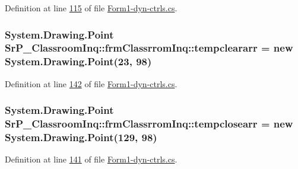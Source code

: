 \-Definition at line \hyperlink{_form1-dyn-ctrls_8cs_source_l00115}{115} of file \hyperlink{_form1-dyn-ctrls_8cs_source}{\-Form1-\/dyn-\/ctrls.\-cs}.

\hypertarget{class_sr_p___classroom_inq_1_1frm_classrrom_inq_a189c01a3745fca62a8250be6a3517894}{
\subsubsection[{tempcleararr}]{\setlength{\rightskip}{0pt plus 5cm}\-System.\-Drawing.\-Point {\bf \-Sr\-P\-\_\-\-Classroom\-Inq\-::frm\-Classrrom\-Inq\-::tempcleararr} = new \-System.\-Drawing.\-Point(23, 98)}}
\label{class_sr_p___classroom_inq_1_1frm_classrrom_inq_a189c01a3745fca62a8250be6a3517894}


\-Definition at line \hyperlink{_form1-dyn-ctrls_8cs_source_l00142}{142} of file \hyperlink{_form1-dyn-ctrls_8cs_source}{\-Form1-\/dyn-\/ctrls.\-cs}.

\hypertarget{class_sr_p___classroom_inq_1_1frm_classrrom_inq_a6ad2bdb537cfc35b174dd16dd8e03904}{
\subsubsection[{tempclosearr}]{\setlength{\rightskip}{0pt plus 5cm}\-System.\-Drawing.\-Point {\bf \-Sr\-P\-\_\-\-Classroom\-Inq\-::frm\-Classrrom\-Inq\-::tempclosearr} = new \-System.\-Drawing.\-Point(129, 98)}}
\label{class_sr_p___classroom_inq_1_1frm_classrrom_inq_a6ad2bdb537cfc35b174dd16dd8e03904}


\-Definition at line \hyperlink{_form1-dyn-ctrls_8cs_source_l00141}{141} of file \hyperlink{_form1-dyn-ctrls_8cs_source}{\-Form1-\/dyn-\/ctrls.\-cs}.

